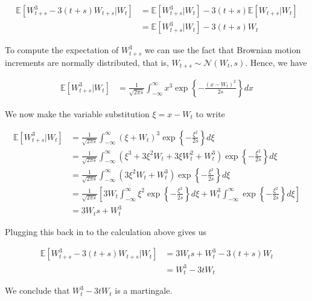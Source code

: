 \documentclass[12pt, a4paper]{article}
\begin{document}
\begin{enumerate}
\begin{enumerate}
        \begin{align*}
            \mathbb E \left[ W_{t+s}^3 - 3(t+s) W_{t+s} \Big| W_t \right] &= \mathbb E \left[ W_{t+s}^3 \Big| W_t \right] - 3(t+s) \mathbb E \left[ W_{t+s} \Big| W_t \right] \\
            &= \mathbb E \left[ W_{t+s}^3 \Big| W_t \right] -3(t+s)W_t
        \end{align*}

        To compute the expectation of $W_{t+s}^3$ we can use the fact that Brownian motion increments are normally distributed, that is, $W_{t+s} \sim \mathcal N(W_t, s)$. Hence, we have 

        \begin{align*}
            \mathbb E\left[W_{t+s}^3 \Big| W_t \right] &= \frac{1}{\sqrt{2 \pi s}}\int_{-\infty}^\infty x^3 \exp \left\{-\frac{(x-W_t)^2}{2s}\right\} dx
        \end{align*}

        We now make the variable substitution $\xi = x-W_t$ to write 

        \begin{align*}
            \mathbb E\left[W_{t+s}^3 \Big| W_t \right] &= \frac{1}{\sqrt{2 \pi s}}\int_{-\infty}^\infty (\xi+W_t)^3 \exp \left\{-\frac{\xi^2}{2s}\right\} d\xi\\
            &= \frac{1}{\sqrt{2 \pi s}}\int_{-\infty}^\infty \left(\xi^3 + 3\xi^2 W_t + 3\xi W_t^2 + W_t^3\right) \exp \left\{-\frac{\xi^2}{2s}\right\} d\xi \\
            &= \frac{1}{\sqrt{2 \pi s}}\int_{-\infty}^\infty \left( 3\xi^2 W_t + W_t^3\right) \exp \left\{-\frac{\xi^2}{2s}\right\} d\xi \\
            &= \frac{1}{\sqrt{2\pi s}} \left[ 3W_t \int_{-\infty}^\infty \xi^2 \exp \left\{-\frac{\xi^2}{2s}\right\} d\xi + W_t^3 \int_{-\infty}^\infty \exp \left\{-\frac{\xi^2}{2s}\right\} d\xi \right]\\
            &= 3W_t s + W_t^3
        \end{align*}

        Plugging this back in to the calculation above gives us 

        \begin{align*}
            \mathbb E \left[ W_{t+s}^3 - 3(t+s) W_{t+s} \Big| W_t \right] &= 3W_t s+W_t^3 - 3(t+s)W_t\\
            &= W_t^3 - 3tW_t
        \end{align*}

        We conclude that $W_t^3 - 3tW_t$ is a martingale. 


\end{enumerate}
\end{enumerate}
\end{document}
